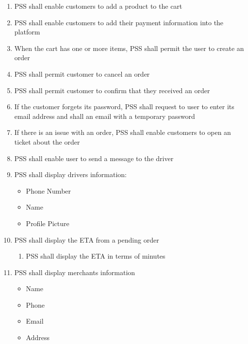     \begin{enumerate}[resume, label=SY-\arabic*]
    \item PSS shall enable customers to add a product to the cart
    \item PSS shall enable customers to add their payment information 
    into the platform
    \item When the cart has one or more items, PSS shall permit the user to 
    create an order
    \item PSS shall permit customer to cancel an order
    \item PSS shall permit customer to confirm that they received an order
    \item If the customer forgets its password, PSS shall request to user to 
    enter its email address and shall an email with a temporary password
    \item If there is an issue with an order, PSS shall enable customers to 
    open an ticket about the order
    \item PSS shall enable user to send a message to the driver
    \item PSS shall display drivers information:
    \begin{itemize}
        \item Phone Number
        \item Name
        \item Profile Picture
    \end{itemize}
    \item PSS shall display the ETA from a pending order
    \begin{enumerate}[label=SY18-\arabic*]
        \item PSS shall display the ETA in terms of minutes
    \end{enumerate}
    \item PSS shall display merchants information
    \begin{itemize}
        \item Name
        \item Phone 
        \item Email 
        \item Address
    \end{itemize}
\end{enumerate}
\pagebreak
